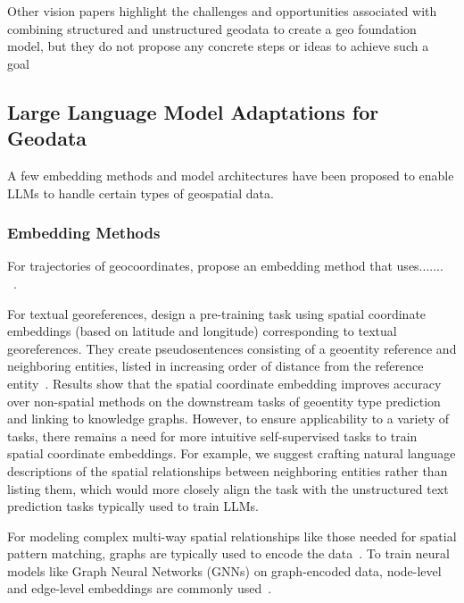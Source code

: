 Other vision papers highlight the challenges and opportunities associated with combining structured and unstructured geodata to create a geo foundation model, but they do not propose any concrete steps or ideas to achieve such a goal~\cite{Xie2023, Tan2023}



\subsection{Large Language Model Adaptations for Geodata}
A few embedding methods and model architectures have been proposed to enable LLMs to handle certain types of geospatial data.

\subsubsection{Embedding Methods}
For trajectories of geocoordinates, \citeauthor{Hu2023} propose an embedding method that uses....... ~\cite{Hu2023}.

For textual georeferences, \citeauthor{Li2021} design a pre-training task using spatial coordinate embeddings (based on latitude and longitude) corresponding to textual georeferences.
They create pseudosentences consisting of a geoentity reference and neighboring entities, listed in increasing order of distance from the reference entity~\cite{Li2021}.
Results show that the spatial coordinate embedding improves accuracy over non-spatial methods on the downstream tasks of geoentity type prediction and linking to knowledge graphs.
However, to ensure applicability to a variety of tasks, there remains a need for more intuitive self-supervised tasks to train spatial coordinate embeddings.
For example, we suggest crafting natural language descriptions of the spatial relationships between neighboring entities rather than listing them, which would more closely align the task with the unstructured text prediction tasks typically used to train LLMs.

For modeling complex multi-way spatial relationships like those needed for spatial pattern matching, graphs are typically used to encode the data~\cite{Folkers2000, Chen2019, Fang2019, Osul2023b}.
To train neural models like Graph Neural Networks (GNNs) on graph-encoded data, node-level and edge-level embeddings are commonly used~\cite{Bai2019,Krlevza2016,Liu2020Neural}. 


